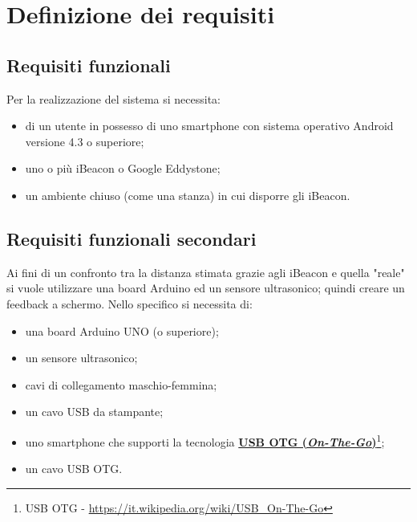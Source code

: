 \chapter{Definizione dei requisiti}
\section{Requisiti funzionali}
Per la realizzazione del sistema si necessita:
\begin{itemize}
	\item di un utente in possesso di uno smartphone con sistema operativo Android versione 4.3 o superiore;
	
	\item uno o più iBeacon o Google Eddystone;
	
	\item un ambiente chiuso (come una stanza) in cui disporre gli iBeacon.
\end{itemize}

\section{Requisiti funzionali secondari}
Ai fini di un confronto tra la distanza stimata grazie agli iBeacon e quella "reale" si vuole utilizzare una board Arduino ed un sensore ultrasonico; quindi creare un feedback a schermo. 
Nello specifico si necessita di:
\begin{itemize}
	\item una board Arduino UNO (o superiore);
	
	\item un sensore ultrasonico;
	
	\item cavi di collegamento maschio-femmina;
	
	\item un cavo USB da stampante;
	
	\item uno smartphone che supporti la tecnologia \href{https://it.wikipedia.org/wiki/USB_On-The-Go}{\textbf{USB OTG (\textit{On-The-Go})}}\footnote{USB OTG - \url{https://it.wikipedia.org/wiki/USB_On-The-Go}};
	
	\item un cavo USB OTG.
\end{itemize}

